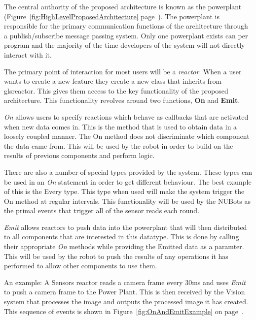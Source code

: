 \documentclass[english,12pt]{scrartcl}
\begin{document}
			The central authority of the proposed architecture is known as the \gls{powerplant} (Figure~\ref{fig:HighLevelProposedArchitecture} page~\pageref{fig:HighLevelProposedArchitecture}).
			The \gls{powerplant} is responsible for the primary communication functions of the architecture through a publish/subscribe message passing system.
			Only one \gls{powerplant} exists can per program and the majority of the time developers of the system will not directly interact with it.

			The primary point of interaction for most users will be a \emph{\gls{reactor}}.
			When a user wants to create a new feature they create a new class that inherits from gls{reactor}.
			This gives them access to the key functionality of the proposed architecture. This functionality revolves around two functions, \textbf{On} and \textbf{Emit}.
			
			\emph{On} allows users to specify \glspl{reaction} which behave as callbacks that are activated when new data comes in. This is the method that is used to obtain data in a loosely coupled manner. The On method does not discriminate which component the data came from. This will be used by the robot in order to build on the results of previous components and perform logic.
			
			There are also a number of special types provided by the system.
			These types can be used in an \emph{On} statement in order to get different behaviour.
			The best example of this is the Every type. This type when used will make the system trigger the On method at regular intervals.
			This functionality will be used by the NUBots as the primal events that trigger all of the sensor reads each round.
			
			\emph{Emit} allows \glspl{reactor} to push data into the \gls{powerplant} that will then distributed to all components that are interested in this datatype. This is done by calling their appropriate \emph{On} methods while providing the Emitted data as a paramter.
			This will be used by the robot to push the results of any operations it has performed to allow other components to use them.
			
			An example: A Sensors reactor reads a camera frame every 30ms and uses \emph{Emit} to push a camera frame to the Power Plant. This is then received by the Vision system that processes the image and outputs the processed image it has created. This sequence of events is shown in Figure~\ref{fig:OnAndEmitExample} on page~\pageref{fig:OnAndEmitExample}.
			
\end{document}
